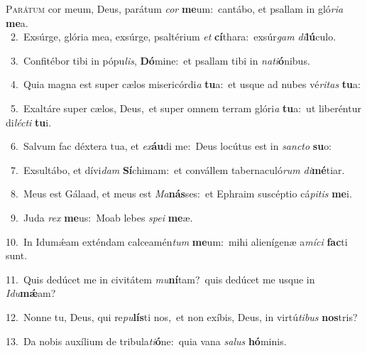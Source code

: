 \lettrine{\initial\textcolor{\initialcolor}{P}}{arátum} cor meum, Deus, parátum \textit{cor} \textbf{me}\-um:~\star cantábo, et psallam in gló\-\textit{ri}\-\textit{a} \textbf{me}\-a.\\
{\numbfont\textcolor{\numbcolor}{~2.}}~Exsúrge, glória mea, exsúrge, psaltérium \textit{et} \textbf{cí}\-thara:~\star exsúr\textit{gam} \textit{di}\-\textbf{lú}culo.\par
{\numbfont\textcolor{\numbcolor}{~3.}}~Confitébor tibi in pópu\-\textit{lis}\-, \textbf{Dó}\-mine:~\star et psallam tibi in \textit{na}\-\textit{ti}\textbf{ó}nibus.\par
{\numbfont\textcolor{\numbcolor}{~4.}}~Quia magna est super cælos misericórdi\textit{a} \textbf{tu}\-a:~\star et usque ad nubes vé\-\textit{ri}\-\textit{tas} \textbf{tu}\-a:\par
{\numbfont\textcolor{\numbcolor}{~5.}}~Exaltáre super cælos, Deus,~\dagger et super omnem terram glóri\textit{a} \textbf{tu}\-a:~\star ut liberéntur di\-\textit{léc}\-\textit{ti} \textbf{tu}\-i.\par
{\numbfont\textcolor{\numbcolor}{~6.}}~Salvum fac déxtera tua, et \textit{ex}\-\textbf{áu}di me:~\star Deus locútus est in \textit{sanc}\-\textit{to} \textbf{su}\-o:\par
{\numbfont\textcolor{\numbcolor}{~7.}}~Exsultábo, et dívi\textit{dam} \textbf{Sí}\-chimam:~\star et convállem tabernaculó\textit{rum} \textit{di}\-\textbf{mé}tiar.\par
{\numbfont\textcolor{\numbcolor}{~8.}}~Meus est Gálaad, et meus est \textit{Ma}\-\textbf{nás}ses:~\star et Ephraim suscéptio cá\-\textit{pi}\-\textit{tis} \textbf{me}\-i.\par
{\numbfont\textcolor{\numbcolor}{~9.}}~Juda \textit{rex} \textbf{me}\-us:~\star Moab lebes \textit{spe}\-\textit{i} \textbf{me}\-æ.\par
{\numbfont\textcolor{\numbcolor}{10.}}~In Idumǽam exténdam calceamén\textit{tum} \textbf{me}\-um:~\star mihi alienígenæ a\-\textit{mí}\-\textit{ci} \textbf{fac}\-ti sunt.\par
{\numbfont\textcolor{\numbcolor}{11.}}~Quis dedúcet me in civitátem \textit{mu}\-\textbf{ní}tam?~\star quis dedúcet me usque in \textit{I}\-\textit{du}\textbf{mǽ}am?\par
{\numbfont\textcolor{\numbcolor}{12.}}~Nonne tu, Deus, qui re\-\textit{pu}\-\textbf{lís}ti nos,~\star et non exíbis, Deus, in virtú\-\textit{ti}\-\textit{bus} \textbf{nos}\-tris?\par
{\numbfont\textcolor{\numbcolor}{13.}}~Da nobis auxílium de tribula\-\textit{ti}\-\textbf{ó}ne:~\star quia vana \textit{sa}\-\textit{lus} \textbf{hó}\-minis.\par
